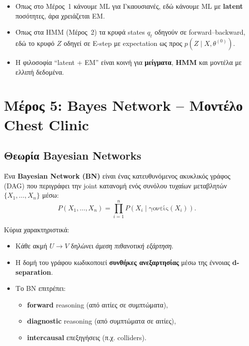 \documentclass[a4paper,11pt]{article}
\begin{document}
\begin{itemize}
  \item Όπως στο Μέρος~1 κάνουμε ML για Γκαουσιανές,
        εδώ κάνουμε ML με \textbf{latent} ποσότητες, άρα χρειάζεται EM.
  \item Όπως στα HMM (Μέρος~2) τα κρυφά states $q_t$ οδηγούν σε forward–backward,
        εδώ το κρυφό $Z$ οδηγεί σε E-step με expectation ως προς $p(Z\mid X,\theta^{(0)})$.
  \item Η φιλοσοφία ``latent + EM'' είναι κοινή για \textbf{μείγματα},
        \textbf{HMM} και μοντέλα με ελλιπή δεδομένα.
\end{itemize}

\clearpage

\section{Μέρος 5: Bayes Network – Μοντέλο Chest Clinic}

\subsection{Θεωρία Bayesian Networks}

Ένα \textbf{Bayesian Network (BN)} είναι ένας κατευθυνόμενος ακυκλικός γράφος (DAG)
που περιγράφει την joint κατανομή ενός συνόλου τυχαίων μεταβλητών
$\{X_1,\dots,X_n\}$ μέσω:
\[
P(X_1,\dots,X_n) = \prod_{i=1}^n P(X_i \mid \text{γονείς}(X_i)).
\]

Κύρια χαρακτηριστικά:

\begin{itemize}
  \item Κάθε ακμή $U\to V$ δηλώνει \emph{άμεση πιθανοτική εξάρτηση}.
  \item Η δομή του γράφου κωδικοποιεί \textbf{συνθήκες ανεξαρτησίας}
        μέσω της έννοιας \textbf{d-separation}.
  \item Το BN επιτρέπει:
        \begin{itemize}
          \item \textbf{forward} reasoning (από αιτίες σε συμπτώματα),
          \item \textbf{diagnostic} reasoning (από συμπτώματα σε αιτίες),
          \item \textbf{intercausal} επεξηγήσεις (π.χ. colliders).
        \end{itemize}
\end{itemize}
\end{document}
